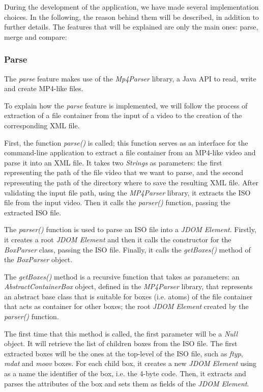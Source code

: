 During the development of the application, we have made several implementation choices. In the following, the reason behind them will be described, in addition to further details. The features that will be explained are only the main ones: parse, merge and compare:

\subsubsection*{Parse}

The \emph{parse} feature makes use of the \emph{Mp4Parser} library, a Java API to read, write and create MP4-like files.

To explain how the \emph{parse} feature is implemented, we will follow the process of extraction of a file container from the input of a video to the creation of the corresponding XML file.

First, the function \emph{parse()} is called; this function serves as an interface for the command-line application to extract a file container from an MP4-like video and parse it into an XML file. It takes two \emph{Strings} as parameters: the first representing the path of the file video that we want to parse, and the second representing the path of the directory where to save the resulting XML file. After validating the input file path, using the \emph{MP4Parser} library, it extracts the ISO file from the input video. Then it calls the \emph{parser()} function, passing the extracted ISO file.

The \emph{parser()} function is used to parse an ISO file into a \emph{JDOM Element}. Firstly, it creates a root \emph{JDOM Element} and then it calls the constructor for the \emph{BoxParser} class, passing the ISO file. Finally, it calls the \emph{getBoxes()} method of the \emph{BoxParser} object.

The \emph{getBoxes()} method is a recursive function that takes as parameters: an \emph{AbstractContainerBox} object, defined in the \emph{MP4Parser} library, that represents an abstract base class that is suitable for boxes (i.e. atoms) of the file container that acts as container for other boxes; the root \emph{JDOM Element} created by the \emph{parser()} function.

The first time that this method is called, the first parameter will be a \emph{Null} object. It will retrieve the list of children boxes from the ISO file. The first extracted boxes will be the ones at the top-level of the ISO file, such as \emph{ftyp}, \emph{mdat} and \emph{moov} boxes.
For each child box, it creates a new \emph{JDOM Element} using as a name the identifier of the box, i.e. the 4-byte code. Then, it extracts and parses the attributes of the box and sets them as fields of the \emph{JDOM Element}.

